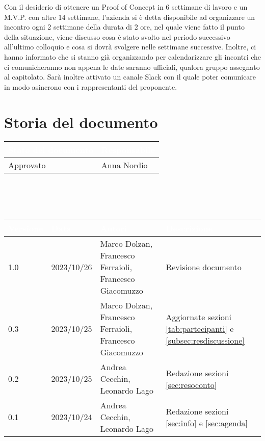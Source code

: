 \documentclass[12pt]{article}
\begin{document}
\begin{enumerate}
Con il desiderio di ottenere un Proof of Concept in 6 settimane di lavoro e un M.V.P. con altre 14 settimane, l'azienda si è detta disponibile ad organizzare un incontro ogni 2 settimane della durata di 2 ore, nel quale viene fatto il punto della situazione, viene discusso cosa è stato svolto nel periodo successivo all'ultimo colloquio e cosa si dovrà svolgere nelle settimane successive. Inoltre, ci hanno informato che si stanno già organizzando per calendarizzare gli incontri che ci comunicheranno non appena le date saranno ufficiali, qualora gruppo assegnato al capitolato.
Sarà inoltre attivato un canale Slack con il quale poter comunicare in modo asincrono con i rappresentanti del proponente.
    
\end{enumerate}

\section{Storia del documento} \label{sec:storia}
\begingroup
\setlength{\tabcolsep}{10pt}
\renewcommand{\arraystretch}{1.5}
\begin{tabularx}{\textwidth}{| X | X |}
    \hline
    \rowcolor{headerrow} \textbf{\textcolor{white}{Stato del documento}} & \textbf{\textcolor{white}{Responsabile}} \\
    \hline
    Approvato & Anna Nordio\\
    \hline   
\end{tabularx}
\\\\\\
\begin{tabularx}{\textwidth}{| l | l | X | X |}
    \hline
    \rowcolor{headerrow} \textbf{\textcolor{white}{Versione}} & \textbf{\textcolor{white}{Data}} & \textbf{\textcolor{white}{Autori}} & \textbf{\textcolor{white}{Descrizione}} \\
    \hline
    1.0 & 2023/10/26 & Marco Dolzan, Francesco Ferraioli, Francesco Giacomuzzo & Revisione documento\\
    \hline
    0.3 & 2023/10/25 &Marco Dolzan, Francesco Ferraioli, Francesco Giacomuzzo & Aggiornate sezioni \ref{tab:partecipanti} e \ref{subsec:resdiscussione} \\
    \hline
    0.2 & 2023/10/25 & Andrea Cecchin, Leonardo Lago & Redazione sezioni \ref{sec:resoconto} \\
    \hline
    0.1 & 2023/10/24 & Andrea Cecchin, Leonardo Lago  & Redazione sezioni \ref{sec:info} e \ref{sec:agenda}\\
    \hline   
\end{tabularx}
\endgroup
\end{document}
